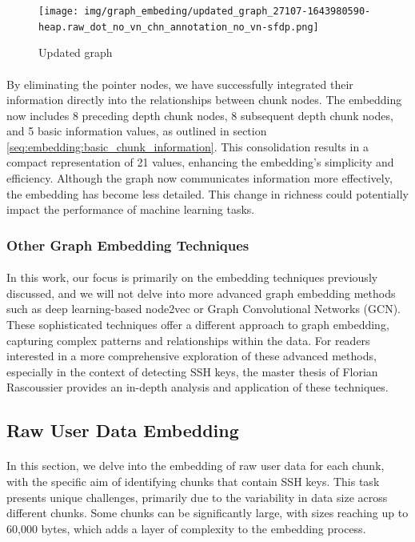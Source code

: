         \begin{figure}[H]
            \centering
            \texttt{[image: img/graph\_embeding/updated\_graph\_27107-1643980590-heap.raw\_dot\_no\_vn\_chn\_annotation\_no\_vn-sfdp.png]}
            \caption{Updated graph}
            \label{fig:graph_embedding:updated_graph}
        \end{figure}

        \paragraph{}By eliminating the pointer nodes, we have successfully integrated their information directly into the relationships between chunk nodes. The embedding now includes 8 preceding depth chunk nodes, 8 subsequent depth chunk nodes, and 5 basic information values, as outlined in section \ref{seq:embedding:basic_chunk_information}. This consolidation results in a compact representation of 21 values, enhancing the embedding's simplicity and efficiency. Although the graph now communicates information more effectively, the embedding has become less detailed. This change in richness could potentially impact the performance of machine learning tasks.

    \subsubsection{Other Graph Embedding Techniques}
        \paragraph{}In this work, our focus is primarily on the embedding techniques previously discussed, and we will not delve into more advanced graph embedding methods such as deep learning-based node2vec or Graph Convolutional Networks (GCN). These sophisticated techniques offer a different approach to graph embedding, capturing complex patterns and relationships within the data. For readers interested in a more comprehensive exploration of these advanced methods, especially in the context of detecting SSH keys, the master thesis of Florian Rascoussier provides an in-depth analysis and application of these techniques.

\subsection{Raw User Data Embedding}
    \paragraph{}In this section, we delve into the embedding of raw user data for each chunk, with the specific aim of identifying chunks that contain SSH keys. This task presents unique challenges, primarily due to the variability in data size across different chunks. Some chunks can be significantly large, with sizes reaching up to 60,000 bytes, which adds a layer of complexity to the embedding process.

